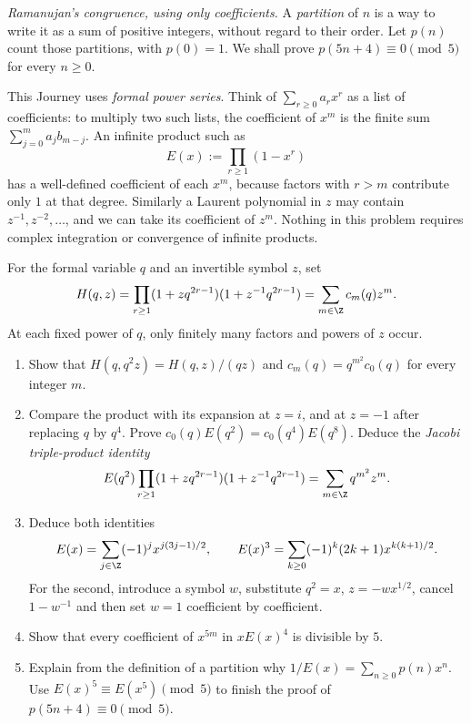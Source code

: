 \begin{exercise}[Journey]\label{pb:ramanujan5}
\emph{Ramanujan's congruence, using only coefficients.}
A \emph{partition} of $n$ is a way to write it as a sum of
positive integers, without regard to their order. Let $p(n)$
count those partitions, with $p(0)=1$. We shall prove
$p(5n+4)\equiv0\pmod5$ for every $n\ge0$.

This Journey uses \emph{formal power series}. Think of
$\sum_{r\ge0}a_rx^r$ as a list of coefficients: to multiply
two such lists, the coefficient of $x^m$ is the finite sum
$\sum_{j=0}^m a_jb_{m-j}$. An infinite product such as
\[
E(x):=\prod_{r\ge1}(1-x^r)
\]
has a well-defined coefficient of each $x^m$, because
factors with $r>m$ contribute only $1$ at that degree.
Similarly a Laurent polynomial in $z$ may contain
$z^{-1},z^{-2},\ldots$, and we can take its coefficient
of $z^m$. Nothing in this problem requires complex
integration or convergence of infinite products.

For the formal variable $q$ and an invertible symbol $z$, set
\[
H(q,z)=\prod_{r\ge1}
(1+zq^{2r-1})(1+z^{-1}q^{2r-1})
=\sum_{m\in\Z}c_m(q)z^m.
\]
At each fixed power of $q$, only finitely many factors
and powers of $z$ occur.
\begin{enumerate}[label=(\alph*)]
\item Show that $H(q,q^2z)=H(q,z)/(qz)$ and
$c_m(q)=q^{m^2}c_0(q)$ for every integer $m$.
\item Compare the product with its expansion at $z=i$,
and at $z=-1$ after replacing $q$ by $q^4$. Prove
$c_0(q)E(q^2)=c_0(q^4)E(q^8)$.
Deduce the \emph{Jacobi triple-product identity}
\[
E(q^2)\prod_{r\ge1}
(1+zq^{2r-1})(1+z^{-1}q^{2r-1})
=\sum_{m\in\Z}q^{m^2}z^m.
\]
\item Deduce both identities
\[
E(x)=\sum_{j\in\Z}(-1)^jx^{j(3j-1)/2},
\qquad
E(x)^3=\sum_{k\ge0}(-1)^k(2k+1)x^{k(k+1)/2}.
\]
For the second, introduce a symbol $w$, substitute
$q^2=x$, $z=-wx^{1/2}$, cancel $1-w^{-1}$
and then set $w=1$ coefficient by coefficient.
\item Show that every coefficient of $x^{5m}$ in
$xE(x)^4$ is divisible by $5$.
\item Explain from the definition of a partition why
$1/E(x)=\sum_{n\ge0}p(n)x^n$. Use
$E(x)^5\equiv E(x^5)\pmod5$ to finish the proof
of $p(5n+4)\equiv0\pmod5$.
\end{enumerate}
\end{exercise}

